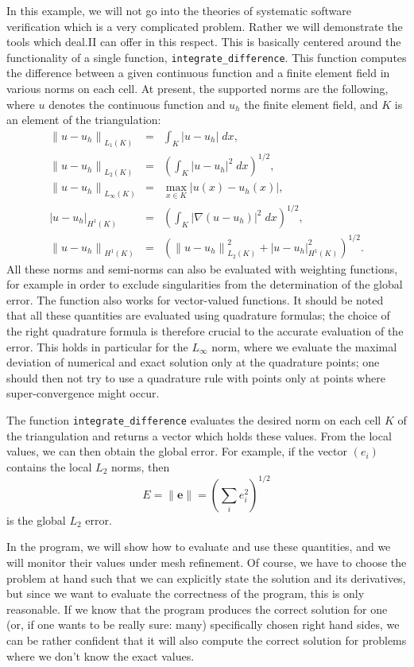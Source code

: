 \documentclass{article}
\begin{document}
In this example, we will not go into the theories of systematic software
verification which is a very complicated problem. Rather we will demonstrate
the tools which deal.II can offer in this respect. This is basically centered
around the functionality of a single function, \texttt{integrate\_difference}.
This function computes the difference between a given continuous function and
a finite element field in various norms on each cell. At present, the
supported norms are the following, where $u$ denotes the continuous function
and $u_h$ the finite element field, and $K$ is an element of the
triangulation:
\begin{eqnarray*}
  {\| u-u_h \|}_{L_1(K)} &=& \int_K |u-u_h| \; dx,
  \\
  {\| u-u_h \|}_{L_2(K)} &=& \left( \int_K |u-u_h|^2 \; dx \right)^{1/2},
  \\
  {\| u-u_h \|}_{L_\infty(K)} &=& \max_{x  \in K} |u(x) - u_h(x)|,
  \\
  {| u-u_h |}_{H^1(K)} &=& \left( \int_K |\nabla(u-u_h)|^2 \; dx \right)^{1/2},
  \\
  {\| u-u_h \|}_{H^1(K)} &=& \left( {\| u-u_h \|}^2_{L_2(K)} 
                                   +{| u-u_h |}^2_{H^1(K)}    \right)^{1/2}.
\end{eqnarray*}
All these norms and semi-norms can also be evaluated with weighting functions,
for example in order to exclude singularities from the determination of the
global error. The function also works for vector-valued functions.  It should
be noted that all these quantities are evaluated using quadrature formulas;
the choice of the right quadrature formula is therefore crucial to the
accurate evaluation of the error. This holds in particular for the $L_\infty$
norm, where we evaluate the maximal deviation of numerical and exact solution
only at the quadrature points; one should then not try to use a quadrature
rule with points only at points where super-convergence might occur.

The function \texttt{integrate\_difference} evaluates the desired norm on each
cell $K$ of the triangulation and returns a vector which holds these
values. From the local values, we can then obtain the global error. For
example, if the vector $(e_i)$ contains the local $L_2$ norms, then
$$
  E = \| {\mathbf e} \| = \left( \sum_i e_i^2 \right)^{1/2}
$$
is the global $L_2$ error.

In the program, we will show how to evaluate and use these quantities, and we
will monitor their values under mesh refinement. Of course, we have to choose
the problem at hand such that we can explicitly state the solution and its
derivatives, but since we want to evaluate the correctness of the program,
this is only reasonable. If we know that the program produces the correct
solution for one (or, if one wants to be really sure: many) specifically
chosen right hand sides, we can be rather confident that it will also compute
the correct solution for problems where we don't know the exact values.
\end{document}
